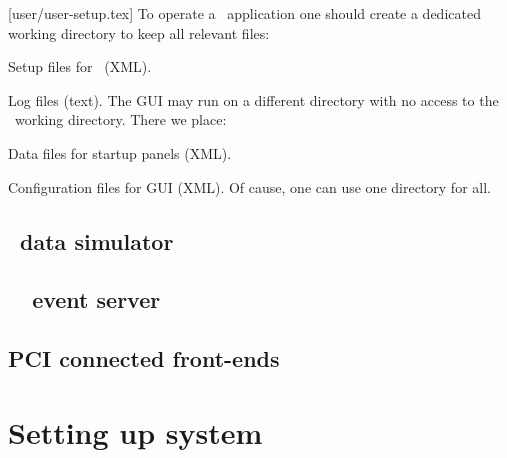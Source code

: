[user/user-setup.tex]
To operate a \dabc\ application one should create a dedicated 
working directory to keep all relevant files:
\bbul
\item Setup files for \dabc\ (XML).
\item Log files (text).
\ebul
The GUI may run on a different directory with no access to the \dabc\ working directory.
There we place:
\bbul
\item Data files for startup panels (XML).
\item Configuration files for GUI (XML).
\ebul
Of cause, one can use one directory for all.
\subsection[DABC data simulator]{\dabc\ data simulator}
\subsection[DABC MBS event server]{\dabc\ \mbs\ event server}
\subsection{PCI connected front-ends}
\section{Setting up system}
